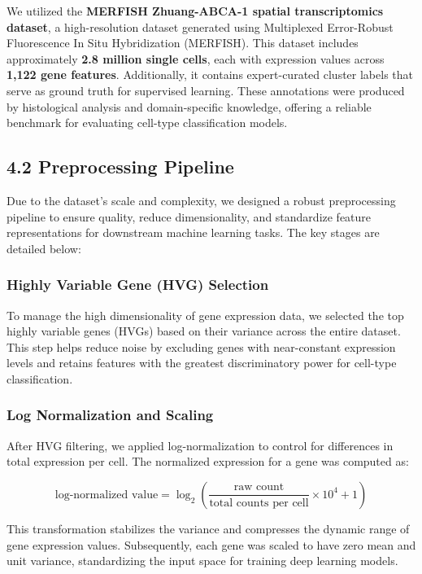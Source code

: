 \documentclass[unnumsec,webpdf,contemporary,medium]{oup-authoring-template}
\begin{document}
We utilized the \textbf{MERFISH Zhuang-ABCA-1 spatial transcriptomics dataset}, a high-resolution dataset generated using Multiplexed Error-Robust Fluorescence In Situ Hybridization (MERFISH). This dataset includes approximately \textbf{2.8 million single cells}, each with expression values across \textbf{1,122 gene features}. Additionally, it contains expert-curated cluster labels that serve as ground truth for supervised learning. These annotations were produced by histological analysis and domain-specific knowledge, offering a reliable benchmark for evaluating cell-type classification models.

\subsection{4.2 Preprocessing Pipeline}

Due to the dataset’s scale and complexity, we designed a robust preprocessing pipeline to ensure quality, reduce dimensionality, and standardize feature representations for downstream machine learning tasks. The key stages are detailed below:

\subsubsection{Highly Variable Gene (HVG) Selection}

To manage the high dimensionality of gene expression data, we selected the top highly variable genes (HVGs) based on their variance across the entire dataset. This step helps reduce noise by excluding genes with near-constant expression levels and retains features with the greatest discriminatory power for cell-type classification.

\subsubsection{Log Normalization and Scaling}

After HVG filtering, we applied log-normalization to control for differences in total expression per cell. The normalized expression for a gene was computed as:

\[
\text{log-normalized value} = \log_2 \left( \frac{\text{raw count}}{\text{total counts per cell}} \times 10^4 + 1 \right)
\]

This transformation stabilizes the variance and compresses the dynamic range of gene expression values. Subsequently, each gene was scaled to have zero mean and unit variance, standardizing the input space for training deep learning models.
\end{document}
